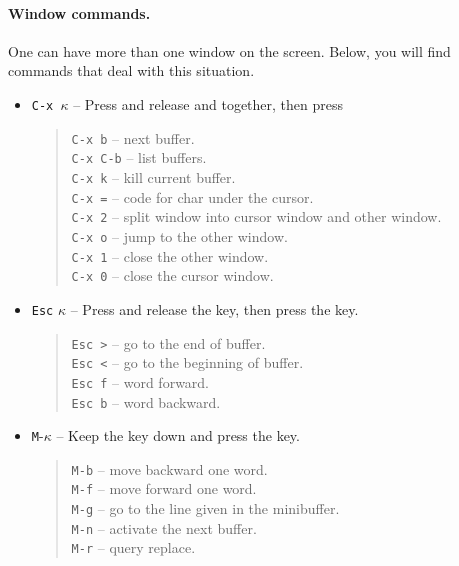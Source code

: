 \documentclass[a4paper,12pt]{book}
\begin{document}
\paragraph{Window commands.} One can have more
than one window on the screen. Below, you will
find commands that deal with this situation.
\begin{itemize}
	\item \verb|C-x |$\kappa$ -- Press and release 
		and  together, then press \keys{$\kappa$} 
		\begin{quote}
			\verb|C-x b| -- next buffer.\\
			\verb|C-x C-b| -- list buffers.\\
			\verb|C-x k| -- kill current buffer.\\
			\verb|C-x =| -- code for char under the cursor.\\
			\verb|C-x 2| -- split window into cursor window and other window.\\
			\verb|C-x o| -- jump to the other window.\\
			\verb|C-x 1| -- close the other window.\\
			\verb|C-x 0| -- close the cursor window.
		\end{quote}
	\item \verb|Esc| $\kappa$ -- Press and release the  key,
		then press the \keys{$\kappa$} key.
		\begin{quote}
			\verb|Esc >| -- go to the end of buffer.\\
			\verb|Esc <| -- go to the beginning of buffer.\\ 
			\verb|Esc f| -- word forward.\\
			\verb|Esc b| -- word backward.\\
		\end{quote}
	\item \verb|M|-$\kappa$ -- Keep the  key
		down and press the \keys{$\kappa$} key.
		\begin{quote}
			\verb|M-b| -- move backward one word.\\
			\verb|M-f| -- move forward one word.\\
			\verb|M-g| -- go to the line given in the minibuffer.\\
			\verb|M-n| -- activate the next buffer.\\
			\verb|M-r| -- query replace.
		\end{quote}
\end{itemize}
\end{document}
